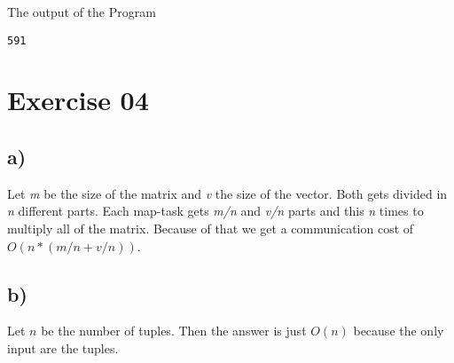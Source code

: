\documentclass[11pt,a4paper]{scrartcl}
\begin{document}
The output of the Program

\begin{lstlisting}
591
\end{lstlisting}

\section*{Exercise 04}

\subsection*{a)}

Let \textit{m} be the size of the matrix and \textit{v} the size of the vector. Both gets divided in \textit{n} different parts. Each map-task gets \textit{m/n} and \textit{v/n} parts and this \textit{n} times to multiply all of the matrix. Because of that we get a communication cost of $O(n * (m/n + v/n))$.

\subsection*{b)}

Let $n$ be the number of tuples. Then the answer is just $O(n)$ because the only input are the tuples.
\end{document}

